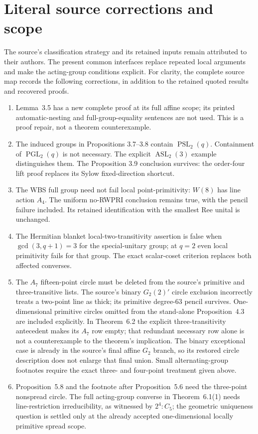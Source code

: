\documentclass[11pt,a4paper]{article}
\begin{document}


\section{Literal source corrections and scope}
The source's classification strategy and its retained inputs remain
attributed to their authors. The present common interfaces replace
repeated local arguments and make the acting-group conditions explicit.
For clarity, the complete source map records the following corrections,
in addition to the retained quoted results and recovered proofs.
\begin{enumerate}
\item Lemma~3.5 has a new complete proof at its full affine scope;
its printed automatic-nesting and full-group-equality sentences are
not used. This is a proof repair, not a theorem counterexample.
\item The induced groups in Propositions 3.7--3.8 contain
$\operatorname{PSL}_2(q)$. Containment of $\operatorname{PGL}_2(q)$
is not necessary.
The explicit $\operatorname{ASL}_2(3)$ example distinguishes them.
The Proposition 3.9 conclusion survives: the order-four lift proof
replaces its Sylow fixed-direction shortcut.
\item The WBS full group need not fail local point-primitivity:
$W(8)$ has line action $A_4$. The uniform no-RWPRI conclusion remains
true, with the pencil failure included. Its retained identification
with the smallest Ree unital is unchanged.
\item The Hermitian blanket local-two-transitivity assertion is false
when $\gcd(3,q+1)=3$ for the special-unitary group; at $q=2$ even
local primitivity fails for that group. The exact scalar-coset criterion
replaces both affected converses.
\item The $A_7$ fifteen-point circle must be deleted from the source's
primitive and three-transitive lists. The source's binary $G_2(2)'$
circle exclusion incorrectly treats a two-point line as thick; its
primitive degree-63 pencil survives. One-dimensional primitive circles
omitted from the stand-alone Proposition~4.3 are included explicitly.
In Theorem~6.2 the explicit three-transitivity antecedent makes its
$A_7$ row empty; that redundant necessary row alone is not a
counterexample to the theorem's implication. The binary exceptional
case is already in the source's final affine
$G_2$ branch, so its restored circle description does not enlarge that
final union. Small alternating-group footnotes require the exact
three- and four-point treatment given above.
\item Proposition~5.8 and the footnote after Proposition~5.6 need the
three-point nonspread circle. The full acting-group converse in
Theorem~6.1(1) needs line-restriction irreducibility, as witnessed by
$2^4:C_5$; the geometric uniqueness question is settled only at the
already accepted one-dimensional locally primitive spread scope.
\end{enumerate}
\end{document}
